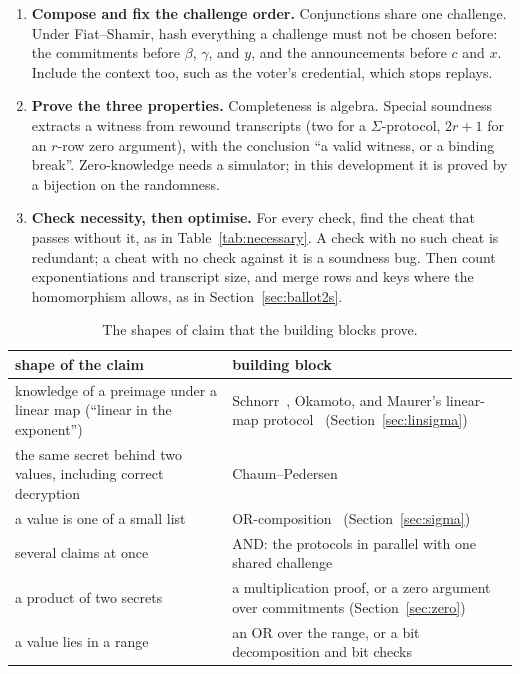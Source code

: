 \documentclass[11pt,a4paper]{article}
\theoremstyle{remark}
\begin{document}
\begin{enumerate}[leftmargin=*]
  \item \textbf{Compose and fix the challenge order.} Conjunctions share
  one challenge. Under Fiat--Shamir, hash everything a challenge must not
  be chosen before: the commitments before $\beta$, $\gamma$, and $y$, and
  the announcements before $c$ and $x$. Include the context too, such as
  the voter's credential, which stops replays.

  \item \textbf{Prove the three properties.} Completeness is algebra.
  Special soundness extracts a witness from rewound transcripts (two for a
  $\Sigma$-protocol, $2r + 1$ for an $r$-row zero argument), with the
  conclusion ``a valid witness, or a binding break''. Zero-knowledge needs
  a simulator; in this development it is proved by a bijection on the
  randomness.

  \item \textbf{Check necessity, then optimise.} For every check, find the
  cheat that passes without it, as in Table~\ref{tab:necessary}. A check
  with no such cheat is redundant; a cheat with no check against it is a
  soundness bug. Then count exponentiations and transcript size, and merge
  rows and keys where the homomorphism allows, as in
  Section~\ref{sec:ballot2s}.
\end{enumerate}

\begin{table}[ht]
  \centering
  \caption{The shapes of claim that the building blocks prove.}
  \label{tab:shapes}
  \begin{tabularx}{\textwidth}{@{}>{\raggedright\arraybackslash}X>{\raggedright\arraybackslash}X@{}}
    \toprule
    shape of the claim & building block \\
    \midrule
    knowledge of a preimage under a linear map (``linear in the exponent'') &
    Schnorr~\cite{schnorr}, Okamoto, and Maurer's linear-map
    protocol~\cite{maurer} (Section~\ref{sec:linsigma}) \\
    the same secret behind two values, including correct decryption &
    Chaum--Pedersen~\cite{chaumpedersen} \\
    a value is one of a small list & OR-composition~\cite{cds}
    (Section~\ref{sec:sigma}) \\
    several claims at once & AND: the protocols in parallel with one shared
    challenge \\
    a product of two secrets & a multiplication proof, or a zero argument
    over commitments (Section~\ref{sec:zero}) \\
    a value lies in a range & an OR over the range, or a bit decomposition
    and bit checks \\
    \bottomrule
  \end{tabularx}
\end{table}
\end{document}
